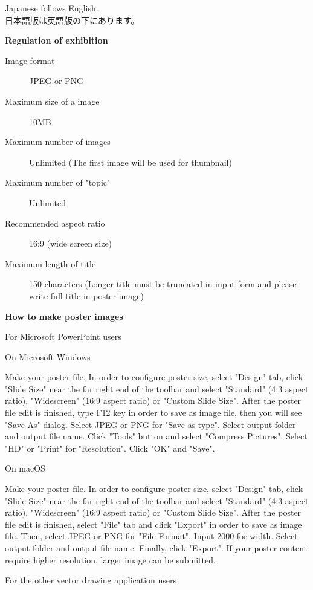 \documentclass[titlepage,10pt,a4paper,uplatex]{jsbook}
\newenvironment{content}{\begin{shaded}\vspace{-1em}\raggedright\ttfamily\footnotesize\setlength{\baselineskip}{1.4em}}{\end{shaded}\vspace{-1em}}
\renewcommand{\textbf}[1]{{\bfseries\sffamily#1}}
\begin{document}
\begin{content}
Japanese follows English.\\
日本語版は英語版の下にあります。

\textbf{\Large Regulation of exhibition}

\begin{description}
\item[Image format] JPEG or PNG
\item[Maximum size of a image] 10MB
\item[Maximum number of images] Unlimited (The first image will be used for thumbnail)
\item[Maximum number of "topic"] Unlimited
\item[Recommended aspect ratio] 16:9 (wide screen size)
\item[Maximum length of title] 150 characters (Longer title must be truncated in input form and please write full title in poster image)
\end{description}

\textbf{\Large How to make poster images}

{\Large For Microsoft PowerPoint users}

{\large On Microsoft Windows}

Make your poster file. In order to configure poster size, select "Design" tab, click "Slide Size" near the far right end of the toolbar and select "Standard" (4:3 aspect ratio), "Widescreen" (16:9 aspect ratio) or "Custom Slide Size". After the poster file edit is finished, type F12 key in order to save as image file, then you will see "Save As" dialog. Select JPEG or PNG for "Save as type". Select output folder and output file name. Click "Tools" button and select "Compress Pictures". Select "HD" or "Print" for "Resolution". Click "OK" and "Save".

{\large On macOS}

Make your poster file. In order to configure poster size, select "Design" tab, click "Slide Size" near the far right end of the toolbar and select "Standard" (4:3 aspect ratio), "Widescreen" (16:9 aspect ratio) or "Custom Slide Size". After the poster file edit is finished, select "File" tab and click "Export" in order to save as image file. Then, select JPEG or PNG for "File Format". Input 2000 for width. Select output folder and output file name. Finally, click "Export". If your poster content require higher resolution, larger image can be submitted.

{\Large For the other vector drawing application users}


\end{content}
\end{document}
